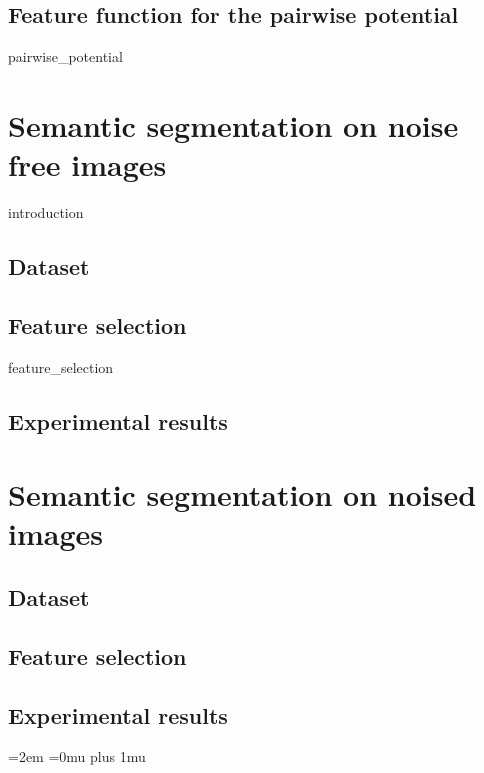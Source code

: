 \documentclass[12pt]{report}
\begin{document}
\subsection{Feature function for the pairwise potential}
{pairwise_potential}

\section{Semantic segmentation on noise free images}
{introduction} 
    \subsection{Dataset}

    \subsection{Feature selection}
    \label{sec:feature_selection_noise_free}
    {feature_selection}
    
    \subsection{Experimental results}	
    

\section{Semantic segmentation on noised images}
    \subsection{Dataset}
    
    \subsection{Feature selection}
    \label{sec:feature_selection_noise}
    
    \subsection{Experimental results}	





\newpage
\emergencystretch=2em
\Urlmuskip=0mu plus 1mu\relax
\printbibliography 
\end{document}
